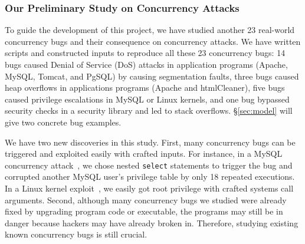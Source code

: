 


\vspace{-.15in}\subsubsection{Our Preliminary Study on Concurrency Attacks} 
\label{sec:our-study}\vspace{-.075in}

To guide the development of this \xxx project, we have studied another 23 
real-world concurrency bugs and their consequence on concurrency attacks. We 
have written scripts and constructed inputs to reproduce all these 23 
concurrency bugs: 14 bugs caused Denial of Service (DoS) attacks in application 
programs (Apache, MySQL, Tomcat, and PgSQL) by causing segmentation faults, 
three bugs caused heap overflows in applications programs (Apache and 
htmlCleaner), five bugs caused privilege escalations in MySQL or Linux kernels, 
and one bug bypassed security checks in a security library \libsafe and led to 
stack overflows. \S\ref{sec:model} will give two concrete bug examples.

We have two new discoveries in this study. First, many concurrency bugs can be 
triggered and exploited easily with crafted inputs. For instance, in a MySQL 
concurrency attack~\cite{mysql-bug-14747}, we chose nested 
\texttt{select} statements to trigger the bug and corrupted another 
MySQL user's privilege table by only 18 repeated executions. In a Linux kernel 
exploit~\cite{uselib-bug-12791}, we easily got root privilege with 
crafted systems call arguments. Second, although many concurrency bugs we 
studied were already fixed by upgrading program code or executable, the 
programs may still be in danger because hackers may have already broken in. 
Therefore, studying existing known concurrency bugs is still crucial.

